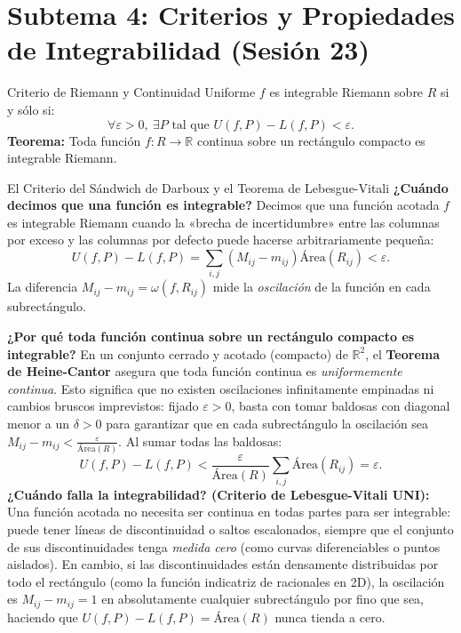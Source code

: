 \documentclass[11pt,a4paper]{article}
\begin{document}
\section{Subtema 4: Criterios y Propiedades de Integrabilidad (Sesión 23)}

\begin{theorempage}{Criterio de Riemann y Continuidad Uniforme}
$f$ es integrable Riemann sobre $R$ si y sólo si:
\[
\forall \varepsilon > 0, \ \exists P \text{ tal que } U(f, P) - L(f, P) < \varepsilon.
\]
\textbf{Teorema:} Toda función $f: R \to \mathbb{R}$ continua sobre un rectángulo compacto es integrable Riemann.
\end{theorempage}

\begin{intuitionbox}{El Criterio del Sándwich de Darboux y el Teorema de Lebesgue-Vitali}
\textbf{¿Cuándo decimos que una función es integrable?} Decimos que una función acotada $f$ es integrable Riemann cuando la «brecha de incertidumbre» entre las columnas por exceso y las columnas por defecto puede hacerse arbitrariamente pequeña:
\[
U(f, P) - L(f, P) = \sum_{i,j} (M_{ij} - m_{ij}) \text{Área}(R_{ij}) < \varepsilon.
\]
La diferencia $M_{ij} - m_{ij} = \omega(f, R_{ij})$ mide la \textit{oscilación} de la función en cada subrectángulo.

\textbf{¿Por qué toda función continua sobre un rectángulo compacto es integrable?}
En un conjunto cerrado y acotado (compacto) de $\mathbb{R}^2$, el \textbf{Teorema de Heine-Cantor} asegura que toda función continua es \textit{uniformemente continua}. Esto significa que no existen oscilaciones infinitamente empinadas ni cambios bruscos imprevistos: fijado $\varepsilon > 0$, basta con tomar baldosas con diagonal menor a un $\delta > 0$ para garantizar que en cada subrectángulo la oscilación sea $M_{ij} - m_{ij} < \frac{\varepsilon}{\text{Área}(R)}$. Al sumar todas las baldosas:
\[
U(f, P) - L(f, P) < \frac{\varepsilon}{\text{Área}(R)} \sum_{i,j} \text{Área}(R_{ij}) = \varepsilon.
\]
\textbf{¿Cuándo falla la integrabilidad? (Criterio de Lebesgue-Vitali UNI):}
Una función acotada no necesita ser continua en todas partes para ser integrable: puede tener líneas de discontinuidad o saltos escalonados, siempre que el conjunto de sus discontinuidades tenga \textit{medida cero} (como curvas diferenciables o puntos aislados). En cambio, si las discontinuidades están densamente distribuidas por todo el rectángulo (como la función indicatriz de racionales en 2D), la oscilación es $M_{ij} - m_{ij} = 1$ en absolutamente cualquier subrectángulo por fino que sea, haciendo que $U(f, P) - L(f, P) = \text{Área}(R)$ nunca tienda a cero.
\end{intuitionbox}
\end{document}
